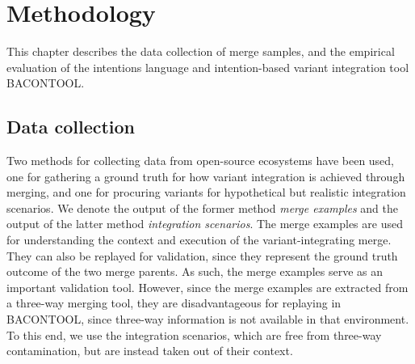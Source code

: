 \chapter{Methodology}
This chapter describes the data collection of merge samples, and the empirical evaluation of the intentions language and intention-based variant integration tool BACONTOOL.

\section{Data collection}
Two methods for collecting data from open-source ecosystems have been used, one for gathering a ground truth for how variant integration is achieved through merging, and one for procuring variants for hypothetical but realistic  integration scenarios. We denote the output of the former method \textit{merge examples} and the output of the latter method \textit{integration scenarios}. The merge examples are used for understanding the context and execution of the variant-integrating merge. They can also be replayed for validation, since they represent the ground truth outcome of the two merge parents. As such, the merge examples serve as an important validation tool. However, since the merge examples are extracted from a three-way merging tool, they are disadvantageous for replaying in BACONTOOL, since three-way information is not available in that environment. To this end, we use the integration scenarios, which are free from three-way contamination, but are instead taken out of their context.

